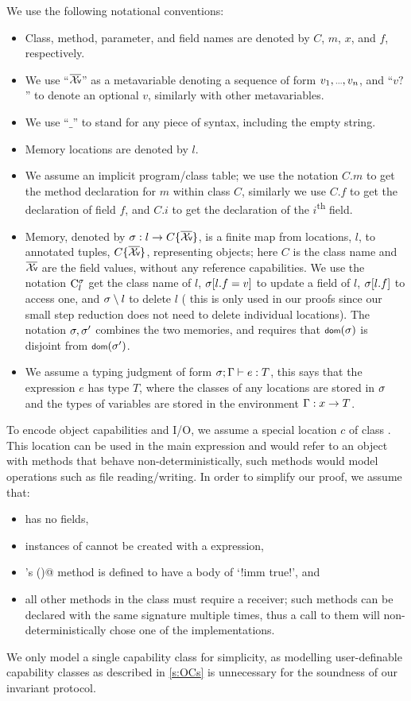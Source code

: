 We use the following notational conventions:
\begin{itemize}
	\item Class, method, parameter, and field names are denoted by $C$, $m$, $x$, and $f$, respectively.
	\item We use ``$\vs$'' as a metavariable denoting a sequence of form $\range{v}$, and ``$v?$'' to denote an optional $v$, similarly with other metavariables.
	\item We use ``$\_$'' to stand for any piece of syntax, including the empty string.
	\item Memory locations are denoted by $l$.
	\item We assume an implicit program/class table; we use the notation $C.m$ to get the method declaration for $m$ within class $C$, similarly we use $C.f$ to get the declaration of field $f$, and $C.i$ to get the declaration of the $i$\textsuperscript{th} field.
	\item Memory, denoted by $\s : l\rightarrow C\{\vs\}$, is a finite map from locations, $l$, to annotated tuples, $C\{\vs\}$, representing objects; here $C$ is the class name and $\vs$ are the 
	field values, without any reference capabilities.
	We use the notation $\mathrm{C}^{\sigma}_{l}$ get the class name of $l$, $\sigma[l.f=v]$ to update a field of $l$, $\sigma[l.f]$ to access one, and $\sigma \setminus l$ to delete $l$ (
this is only used in our proofs since our small step reduction does not need to delete individual locations). The notation $\sigma,\sigma'$ combines the two memories, and requires that $\dom(\s)$ is disjoint from $\dom(\s')$.
	\item We assume a typing judgment of form $\ty{e}{T}$, this says that the expression $e$ has type $T$,
	where the classes of any locations are stored in $\sigma$ and the types of variables are stored in the environment $\Gamma : x\rightarrow T$.
\end{itemize}

\noindent To encode object capabilities and I/O, we assume a special location  $c$ of class \Q@Cap@. This location can be used in the main expression and would refer to an object with methods that behave non-deterministically, such methods would model operations such as file reading/writing. In order to simplify our proof, we assume that:
\begin{itemize}
	\item \Q@Cap@ has no fields,
	\item instances of \Q@Cap@ cannot be created with a \Q@new@ expression,
	\item \Q@Cap@'s \Q@invariant()@ method is defined to have a body of `\Q!imm true!', and
	\item all other methods in the \Q@Cap@ class must require a \Q@mut@ receiver; such methods can be declared with the same signature multiple times, thus a call to them will non-deterministically chose one of the implementations.
\end{itemize}
We only model a single \Q@Cap@ capability class for simplicity, as modelling user-definable capability classes as described in \ref{s:OCs} is unnecessary for the soundness of our invariant protocol.

